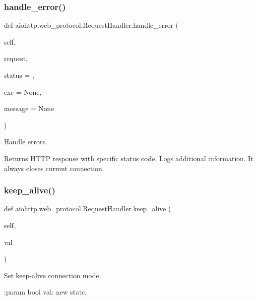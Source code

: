 \subsubsection{\texorpdfstring{handle\+\_\+error()}{handle\_error()}}
{\footnotesize\ttfamily def aiohttp.\+web\+\_\+protocol.\+Request\+Handler.\+handle\+\_\+error (\begin{DoxyParamCaption}\item[{}]{self,  }\item[{}]{request,  }\item[{}]{status = {},  }\item[{}]{exc = {\ttfamily None},  }\item[{}]{message = {\ttfamily None} }\end{DoxyParamCaption})}

\begin{DoxyVerb}Handle errors.

Returns HTTP response with specific status code. Logs additional
information. It always closes current connection.\end{DoxyVerb}
 \mbox{\label{classaiohttp_1_1web__protocol_1_1_request_handler_ab073a98a5ec1ca97277314e24f9b03fb}} 
\subsubsection{\texorpdfstring{keep\+\_\+alive()}{keep\_alive()}}
{\footnotesize\ttfamily def aiohttp.\+web\+\_\+protocol.\+Request\+Handler.\+keep\+\_\+alive (\begin{DoxyParamCaption}\item[{}]{self,  }\item[{}]{val }\end{DoxyParamCaption})}

\begin{DoxyVerb}Set keep-alive connection mode.

:param bool val: new state.
\end{DoxyVerb}
 \mbox{\label{classaiohttp_1_1web__protocol_1_1_request_handler_af66b3af02b5c875e969ad888131984e4}} 
